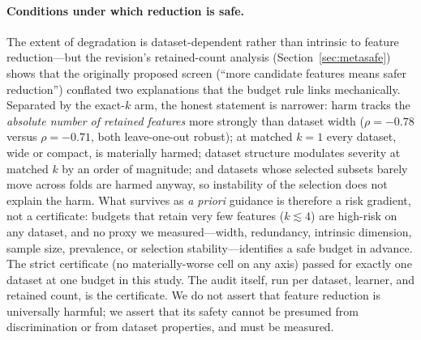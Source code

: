 \documentclass[fleqn,10pt]{wlscirep}
\newcommand{\result}[1]{#1}
\begin{document}
\paragraph{Conditions under which reduction is safe.} The extent of degradation is
dataset-dependent rather than intrinsic to feature reduction---but the revision's retained-count
analysis (Section~\ref{sec:metasafe}) shows that the originally proposed screen (``more candidate
features means safer reduction'') conflated two explanations that the budget rule links mechanically.
Separated by the exact-$k$ arm, the honest statement is narrower: harm tracks the \emph{absolute
number of retained features} more strongly than dataset width ($\rho=\result{-0.78}$ versus
$\rho=\result{-0.71}$,
both leave-one-out robust); at matched $k=1$ every dataset, wide or compact, is materially harmed;
dataset structure modulates severity at matched $k$ by an order of magnitude; and datasets whose
selected subsets barely move across folds are harmed anyway, so instability of the selection does
not explain the harm. What survives as \emph{a priori} guidance is
therefore a risk gradient, not a certificate: budgets that retain very few features
($k\lesssim4$) are high-risk on any dataset, and no proxy we measured---width, redundancy, intrinsic
dimension, sample size, prevalence, or selection stability---identifies a safe budget in advance. The
strict certificate (no materially-worse cell on any axis) passed for exactly one dataset at one
budget in this study. The audit itself, run per dataset, learner, and retained count, is the
certificate. We do not assert that feature reduction is universally harmful; we assert that its
safety cannot be presumed from discrimination or from dataset properties, and must be measured.
\end{document}
